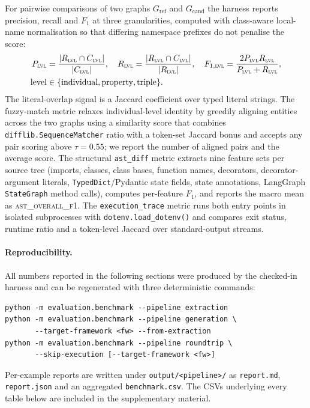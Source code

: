 For pairwise comparisons of two graphs $G_{\text{ref}}$ and
$G_{\text{cand}}$ the harness reports precision, recall and $F_1$ at
three granularities, computed with class-aware local-name normalisation
so that differing namespace prefixes do not penalise the score:
\begin{align*}
  P_{\textsc{lvl}} &= \frac{|R_{\textsc{lvl}}\cap C_{\textsc{lvl}}|}{|C_{\textsc{lvl}}|}, \quad
  R_{\textsc{lvl}} = \frac{|R_{\textsc{lvl}}\cap C_{\textsc{lvl}}|}{|R_{\textsc{lvl}}|}, \quad
  F_{1,\textsc{lvl}} = \frac{2P_{\textsc{lvl}}R_{\textsc{lvl}}}{P_{\textsc{lvl}}+R_{\textsc{lvl}}},\\
  \text{level} &\in \{\text{individual}, \text{property}, \text{triple}\}.
\end{align*}
The literal-overlap signal is a Jaccard coefficient over typed literal
strings. The fuzzy-match metric relaxes individual-level identity by
greedily aligning entities across the two graphs using a similarity
score that combines \texttt{difflib.SequenceMatcher} ratio with a
token-set Jaccard bonus and accepts any pair scoring above
$\tau{=}0{.}55$; we report the number of aligned pairs and the average
score. The structural \texttt{ast\_diff} metric extracts nine feature
sets per source tree (imports, classes, class bases, function names,
decorators, decorator-argument literals, \texttt{TypedDict}/Pydantic
state fields, state annotations, LangGraph \texttt{StateGraph} method
calls), computes per-feature $F_1$, and reports the macro mean as
\textsc{ast\_overall\_f1}. The \texttt{execution\_trace} metric runs
both entry points in isolated subprocesses with
\texttt{dotenv.load\_dotenv()} and compares exit status, runtime ratio
and a token-level Jaccard over standard-output streams.

\paragraph{Reproducibility.}
All numbers reported in the following sections were produced by the
checked-in harness and can be regenerated with three deterministic
commands:
\begin{verbatim}
python -m evaluation.benchmark --pipeline extraction
python -m evaluation.benchmark --pipeline generation \
       --target-framework <fw> --from-extraction
python -m evaluation.benchmark --pipeline roundtrip \
       --skip-execution [--target-framework <fw>]
\end{verbatim}
Per-example reports are written under \texttt{output/<pipeline>/} as
\texttt{report.md}, \texttt{report.json} and an aggregated
\texttt{benchmark.csv}. The CSVs underlying every table below are
included in the supplementary material.

